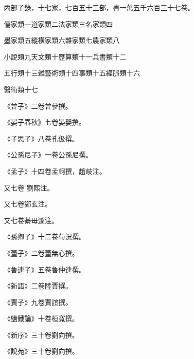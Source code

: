 
\begin{pinyinscope}

 丙部子錄，十七家，七百五十三部，書一萬五千六百三十七卷。



 儒家類一道家類二法家類三名家類四



 墨家類五縱橫家類六雜家類七農家類八



 小說類九天文類十歷算類十一兵書類十二



 五行類十三雜藝術類十四事類十五經脈類十六



 醫術類十七



 《曾子》二卷曾參撰。



 《晏子春秋》七卷晏嬰撰。



 《子思子》八卷孔伋撰。



 《公孫尼子》一卷公孫尼撰。



 《孟子》十四卷孟軻撰，趙岐注。



 又七卷
 劉熙注。



 又七卷鄭玄注。



 又七卷綦毋邃注。



 《孫卿子》十二卷荀況撰。



 《董子》二卷董無心撰。



 《魯連子》五卷魯仲連撰。



 《新語》二卷陸賈撰。



 《賈子》九卷賈誼撰。



 《鹽鐵論》十卷桓寬撰。



 《新序》三十卷劉向撰。



 《說苑》三十卷劉向撰。




\end{pinyinscope}
